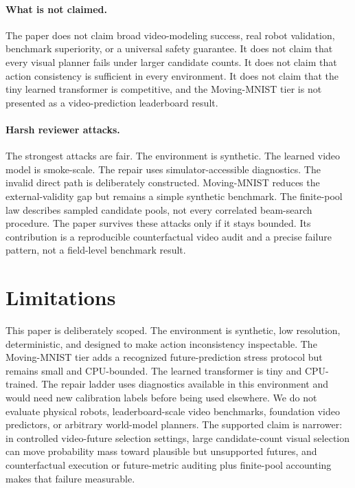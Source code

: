\documentclass{article}
\begin{document}
\paragraph{What is not claimed.}
The paper does not claim broad video-modeling success, real robot validation, benchmark superiority, or a universal safety guarantee. It does not claim that every visual planner fails under larger candidate counts. It does not claim that action consistency is sufficient in every environment. It does not claim that the tiny learned transformer is competitive, and the Moving-MNIST tier is not presented as a video-prediction leaderboard result.

\paragraph{Harsh reviewer attacks.}
The strongest attacks are fair. The environment is synthetic. The learned video model is smoke-scale. The repair uses simulator-accessible diagnostics. The invalid direct path is deliberately constructed. Moving-MNIST reduces the external-validity gap but remains a simple synthetic benchmark. The finite-pool law describes sampled candidate pools, not every correlated beam-search procedure. The paper survives these attacks only if it stays bounded. Its contribution is a reproducible counterfactual video audit and a precise failure pattern, not a field-level benchmark result.

\section{Limitations}

This paper is deliberately scoped. The environment is synthetic, low resolution, deterministic, and designed to make action inconsistency inspectable. The Moving-MNIST tier adds a recognized future-prediction stress protocol but remains small and CPU-bounded. The learned transformer is tiny and CPU-trained. The repair ladder uses diagnostics available in this environment and would need new calibration labels before being used elsewhere. We do not evaluate physical robots, leaderboard-scale video benchmarks, foundation video predictors, or arbitrary world-model planners. The supported claim is narrower: in controlled video-future selection settings, large candidate-count visual selection can move probability mass toward plausible but unsupported futures, and counterfactual execution or future-metric auditing plus finite-pool accounting makes that failure measurable.
\end{document}
